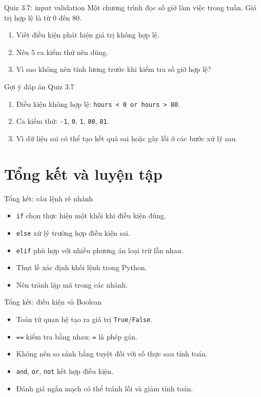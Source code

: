 \documentclass[aspectratio=169,11pt]{beamer}
\newcommand{\code}[1]{\texttt{#1}}
\begin{document}
\begin{frame}{Quiz 3.7: input validation}
Một chương trình đọc số giờ làm việc trong tuần. Giá trị hợp lệ là từ 0 đến 80.
\begin{enumerate}
  \item Viết điều kiện phát hiện giá trị không hợp lệ.
  \item Nêu 5 ca kiểm thử nên dùng.
  \item Vì sao không nên tính lương trước khi kiểm tra số giờ hợp lệ?
\end{enumerate}
\end{frame}

\begin{frame}{Gợi ý đáp án Quiz 3.7}
\begin{enumerate}
  \item Điều kiện không hợp lệ: \code{hours < 0 or hours > 80}.
  \item Ca kiểm thử: \code{-1}, \code{0}, \code{1}, \code{80}, \code{81}.
  \item Vì dữ liệu sai có thể tạo kết quả sai hoặc gây lỗi ở các bước xử lý sau.
\end{enumerate}
\end{frame}

\section{Tổng kết và luyện tập}

\begin{frame}{Tổng kết: câu lệnh rẽ nhánh}
\begin{itemize}
  \item \code{if} chọn thực hiện một khối khi điều kiện đúng.
  \item \code{else} xử lý trường hợp điều kiện sai.
  \item \code{elif} phù hợp với nhiều phương án loại trừ lẫn nhau.
  \item Thụt lề xác định khối lệnh trong Python.
  \item Nên tránh lặp mã trong các nhánh.
\end{itemize}
\end{frame}

\begin{frame}{Tổng kết: điều kiện và Boolean}
\begin{itemize}
  \item Toán tử quan hệ tạo ra giá trị \code{True}/\code{False}.
  \item \code{==} kiểm tra bằng nhau; \code{=} là phép gán.
  \item Không nên so sánh bằng tuyệt đối với số thực sau tính toán.
  \item \code{and}, \code{or}, \code{not} kết hợp điều kiện.
  \item Đánh giá ngắn mạch có thể tránh lỗi và giảm tính toán.
\end{itemize}
\end{frame}
\end{document}
